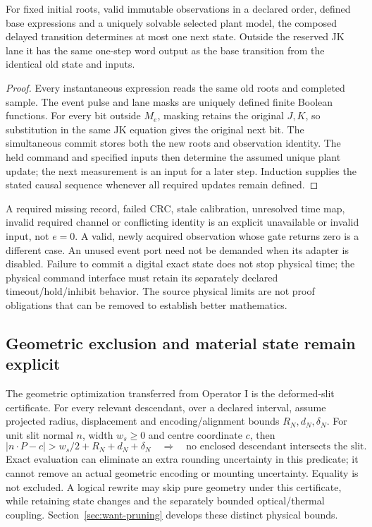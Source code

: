 \begin{proposition}
For fixed initial roots, valid immutable observations in a declared order,
defined base expressions and a uniquely solvable selected plant model, the
composed delayed transition determines at most one next state. Outside the
reserved JK lane it has the same one-step word output as the base transition
from the identical old state and inputs.
\end{proposition}
\begin{proof}
Every instantaneous expression reads the same old roots and completed sample.
The event pulse and lane masks are uniquely defined finite Boolean functions.
For every bit outside $M_e$, masking retains the original $J,K$, so substitution
in the same JK equation gives the original next bit. The simultaneous commit
stores both the new roots and observation identity. The held command and
specified inputs then determine the assumed unique plant update; the next
measurement is an input for a later step. Induction supplies the stated causal
sequence whenever all required updates remain defined.
\end{proof}

A required missing record, failed CRC, stale calibration, unresolved time map,
invalid required channel or conflicting identity is an explicit unavailable or
invalid input, not $e=0$. A valid, newly acquired observation whose gate returns
zero is a different case. An unused event port need not be demanded when its
adapter is disabled. Failure to commit a digital exact state does not stop
physical time; the physical command interface must retain its separately
declared timeout/hold/inhibit behavior. The source physical limits are not
proof obligations that can be removed to establish better mathematics.

\subsection{Geometric exclusion and material state remain explicit}
The geometric optimization transferred from Operator I is the deformed-slit
certificate. For every relevant descendant, over a declared interval, assume
projected radius, displacement and encoding/alignment bounds $R_N,d_N,\delta_N$.
For unit slit normal $n$, width $w_s\ge0$ and centre coordinate $c$, then
\begin{equation}
 |n\cdot P-c|>w_s/2+R_N+d_N+\delta_N
 \quad\Longrightarrow\quad\text{no enclosed descendant intersects the slit}.
\end{equation}
Exact evaluation can eliminate an extra rounding uncertainty in this predicate;
it cannot remove an actual geometric encoding or mounting uncertainty. Equality
is not excluded. A logical rewrite may skip pure geometry under this certificate,
while retaining state changes and the separately bounded optical/thermal coupling.
Section~\ref{sec:want-pruning} develops these distinct physical bounds.


